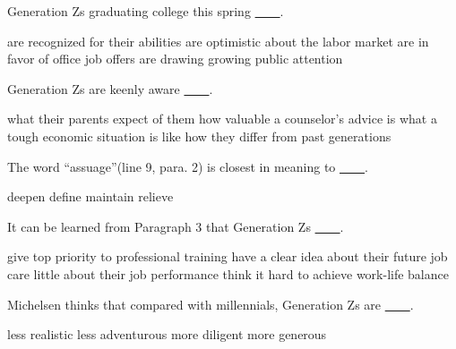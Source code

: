 \item Generation Zs graduating college this spring \uline{~~~~}.
\begin{tasks}
	\task are recognized for their abilities
	\task are optimistic about the labor market
	\task are in favor of office job offers
	\task are drawing growing public attention
\end{tasks}
\item Generation Zs are keenly aware \uline{~~~~}.
\begin{tasks}
	\task what their parents expect of them
	\task how valuable a counselor's advice is
	\task what a tough economic situation is like
	\task how they differ from past generations
\end{tasks}
\item The word ``assuage''(line 9, para. 2) is closest in meaning to \uline{~~~~}.
\begin{tasks}
	\task deepen
	\task define
	\task maintain
	\task relieve
\end{tasks}
\item It can be learned from Paragraph 3 that Generation Zs \uline{~~~~}.
\begin{tasks}
	\task give top priority to professional training
	\task have a clear idea about their future job
	\task care little about their job performance
	\task think it hard to achieve work-life balance
\end{tasks}
\item Michelsen thinks that compared with millennials, Generation Zs are \uline{~~~~}.
\begin{tasks}
	\task less realistic
	\task less adventurous
	\task more diligent
	\task more generous
\end{tasks}